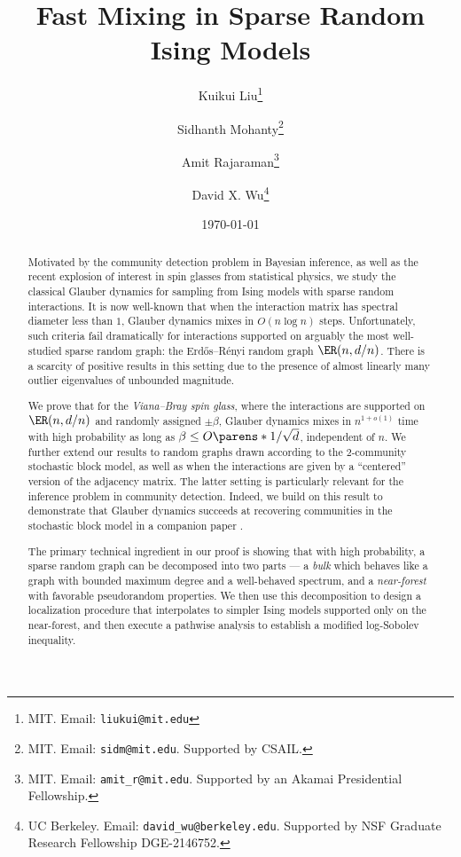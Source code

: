 \documentclass[11pt,letterpaper]{article}
\title{Fast Mixing in Sparse Random Ising Models}
\author{Kuikui Liu\thanks{MIT. Email: \texttt{liukui@mit.edu}}
  \and Sidhanth Mohanty\thanks{MIT. Email: \texttt{sidm@mit.edu}. Supported by CSAIL.}
  \and Amit Rajaraman\thanks{MIT. Email: \texttt{amit\_r@mit.edu}. Supported by an Akamai Presidential Fellowship.}
  \and David X. Wu\thanks{UC Berkeley. Email: \texttt{david\_wu@berkeley.edu}. Supported by NSF Graduate Research Fellowship DGE-2146752.}}
\date{\today}
\begin{document}
\maketitle

\begin{abstract}
    Motivated by the community detection problem in Bayesian inference, as well as the recent explosion of interest in spin glasses from statistical physics, we study the classical Glauber dynamics for sampling from Ising models with sparse random interactions. It is now well-known that when the interaction matrix has spectral diameter less than $1$, Glauber dynamics mixes in $O(n\log n)$ steps. Unfortunately, such criteria fail dramatically for interactions supported on arguably the most well-studied sparse random graph: the Erd\H{o}s--R\'{e}nyi random graph $\ER(n,d/n)$. There is a scarcity of positive results in this setting due to the presence of almost linearly many outlier eigenvalues of unbounded magnitude.

    We prove that for the \emph{Viana--Bray spin glass}, where the interactions are supported on $\ER(n,d/n)$ and randomly assigned $\pm \beta$, Glauber dynamics mixes in $n^{1+o(1)}$ time with high probability as long as $\beta \leq O\parens*{1/\sqrt{d}}$, independent of $n$. We further extend our results to random graphs drawn according to the $2$-community stochastic block model, as well as when the interactions are given by a ``centered'' version of the adjacency matrix. The latter setting is particularly relevant for the inference problem in community detection.
    Indeed, we build on this result to demonstrate that Glauber dynamics succeeds at recovering communities in the stochastic block model in a companion paper \cite{LMRRW24}.

    The primary technical ingredient in our proof is showing that with high probability, a sparse random graph can be decomposed into two parts --- a \emph{bulk} which behaves like a graph with bounded maximum degree and a well-behaved spectrum, and a \emph{near-forest} with favorable pseudorandom properties. We then use this decomposition to design a localization procedure that interpolates to simpler Ising models supported only on the near-forest, and then execute a pathwise analysis to establish a modified log-Sobolev inequality.

\end{abstract}

\thispagestyle{empty}
\setcounter{page}{0}
\newpage

\tableofcontents
\end{document}
